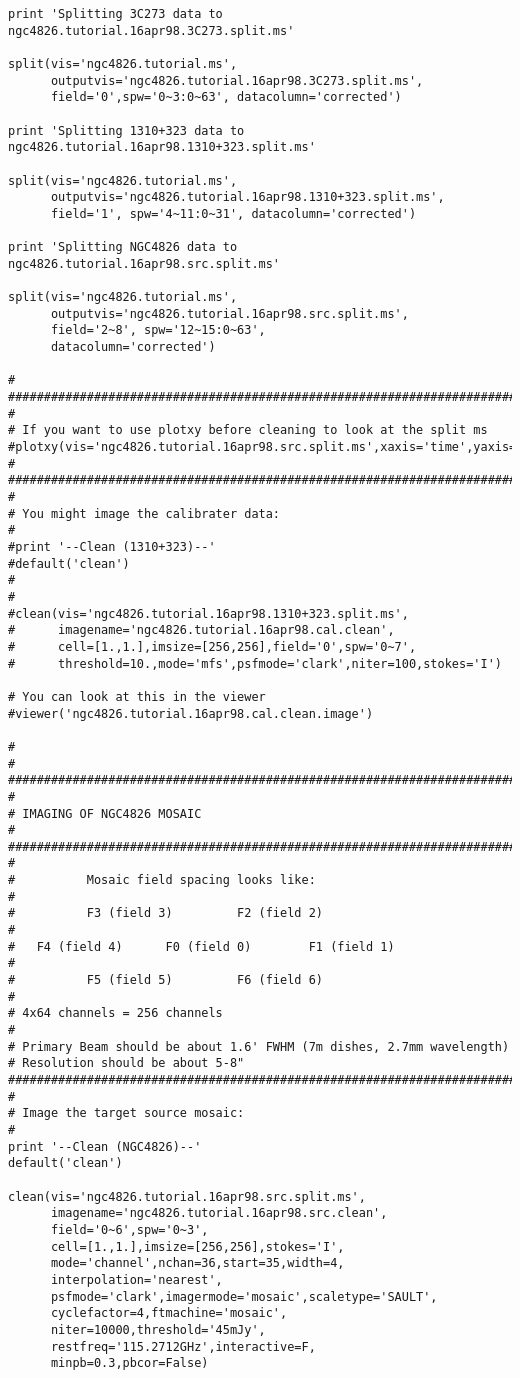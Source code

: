 \begin{verbatim}
print 'Splitting 3C273 data to ngc4826.tutorial.16apr98.3C273.split.ms'

split(vis='ngc4826.tutorial.ms',
      outputvis='ngc4826.tutorial.16apr98.3C273.split.ms',
      field='0',spw='0~3:0~63', datacolumn='corrected')

print 'Splitting 1310+323 data to ngc4826.tutorial.16apr98.1310+323.split.ms'

split(vis='ngc4826.tutorial.ms',
      outputvis='ngc4826.tutorial.16apr98.1310+323.split.ms',
      field='1', spw='4~11:0~31', datacolumn='corrected')

print 'Splitting NGC4826 data to ngc4826.tutorial.16apr98.src.split.ms'

split(vis='ngc4826.tutorial.ms',
      outputvis='ngc4826.tutorial.16apr98.src.split.ms',
      field='2~8', spw='12~15:0~63',
      datacolumn='corrected')

#
##########################################################################
#
# If you want to use plotxy before cleaning to look at the split ms
#plotxy(vis='ngc4826.tutorial.16apr98.src.split.ms',xaxis='time',yaxis='amp')
#
##########################################################################
#
# You might image the calibrater data:
#
#print '--Clean (1310+323)--'
#default('clean')
#
#
#clean(vis='ngc4826.tutorial.16apr98.1310+323.split.ms',
#      imagename='ngc4826.tutorial.16apr98.cal.clean',
#      cell=[1.,1.],imsize=[256,256],field='0',spw='0~7',
#      threshold=10.,mode='mfs',psfmode='clark',niter=100,stokes='I')

# You can look at this in the viewer
#viewer('ngc4826.tutorial.16apr98.cal.clean.image')

#
#
##########################################################################
#
# IMAGING OF NGC4826 MOSAIC
#
##########################################################################
#
#          Mosaic field spacing looks like:
#
#          F3 (field 3)         F2 (field 2)
#
#   F4 (field 4)      F0 (field 0)        F1 (field 1)
#
#          F5 (field 5)         F6 (field 6)
#
# 4x64 channels = 256 channels 
#
# Primary Beam should be about 1.6' FWHM (7m dishes, 2.7mm wavelength)
# Resolution should be about 5-8"
##########################################################################
#
# Image the target source mosaic:
#
print '--Clean (NGC4826)--'
default('clean')

clean(vis='ngc4826.tutorial.16apr98.src.split.ms',
      imagename='ngc4826.tutorial.16apr98.src.clean',
      field='0~6',spw='0~3',
      cell=[1.,1.],imsize=[256,256],stokes='I',
      mode='channel',nchan=36,start=35,width=4,
      interpolation='nearest',
      psfmode='clark',imagermode='mosaic',scaletype='SAULT',
      cyclefactor=4,ftmachine='mosaic',
      niter=10000,threshold='45mJy',
      restfreq='115.2712GHz',interactive=F,
      minpb=0.3,pbcor=False)


\end{verbatim}

